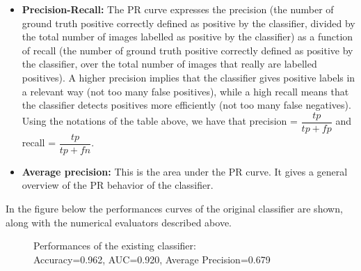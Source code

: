 \documentclass[a4paper]{article}
\begin{document}
\begin{itemize}
        	\item \textbf{Precision-Recall:} The PR curve expresses the precision (the number of ground truth positive correctly defined as positive by the classifier, divided by the total number of images labelled as positive by the classifier) as a function of recall (the number of ground truth positive correctly defined as positive by the classifier, over the total number of images that really are labelled positives). A higher precision implies that the classifier gives positive labels in a relevant way (not too many false positives), while a high recall means that the classifier detects positives more efficiently (not too many false negatives).\\
        	Using the notations of the table above, we have that precision = $\dfrac{tp}{tp+fp}$ and recall = $\dfrac{tp}{tp+fn}$.
            
    		
        	\item \textbf{Average precision:} This is the area under the PR curve. It gives a general overview of the PR behavior of the classifier.
        \end{itemize}
        In the figure below the performances curves of the original classifier are shown, along with the numerical evaluators described above.
        \begin{figure}[H]
        \centering
        \vspace{5pt}
        \caption{Performances of the existing classifier:\\Accuracy=0.962, AUC=0.920, Average Precision=0.679}
    	\end{figure}
\end{document}
